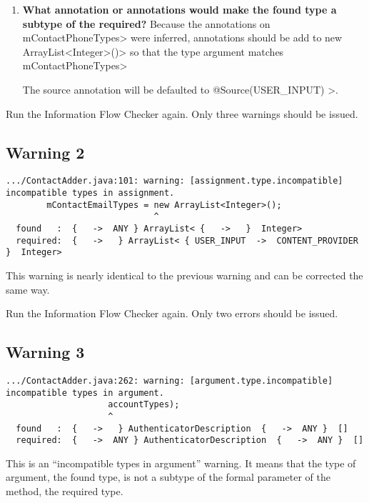 \begin{enumerate}
\item\textbf{What annotation or annotations would make the found type a subtype of the required?}
Because the annotations on \<mContactPhoneTypes> were inferred,  annotations should be add to 
\<new ArrayList\textless Integer\textgreater()> so that the type argument matches  \<mContactPhoneTypes> 

 
 The source annotation will be defaulted to \<@Source(USER\_INPUT) >.
 \end{enumerate}
 
 Run the Information Flow Checker again.  Only three warnings should be issued.
 
 \subsection{Warning 2}
 \begin{Verbatim}
.../ContactAdder.java:101: warning: [assignment.type.incompatible] incompatible types in assignment.
        mContactEmailTypes = new ArrayList<Integer>();
                             ^
  found   :  {   ->  ANY } ArrayList< {   ->   }  Integer>
  required:  {   ->   } ArrayList< { USER_INPUT  ->  CONTENT_PROVIDER }  Integer>
\end{Verbatim} 
This warning is nearly identical to the previous warning and can be corrected the same way.

 \noindent 
Run the Information Flow Checker again.  Only two errors should be issued.


  \subsection{Warning 3 }
   \begin{Verbatim}
.../ContactAdder.java:262: warning: [argument.type.incompatible] incompatible types in argument.
                    accountTypes);
                    ^
  found   :  {   ->   } AuthenticatorDescription  {   ->  ANY }  []
  required:  {   ->  ANY } AuthenticatorDescription  {   ->  ANY }  []
\end{Verbatim} 
This is an ``incompatible types in argument'' warning.  It means that the type
of argument, the found type, is not a subtype of the formal parameter   
 of the method, the required type.

